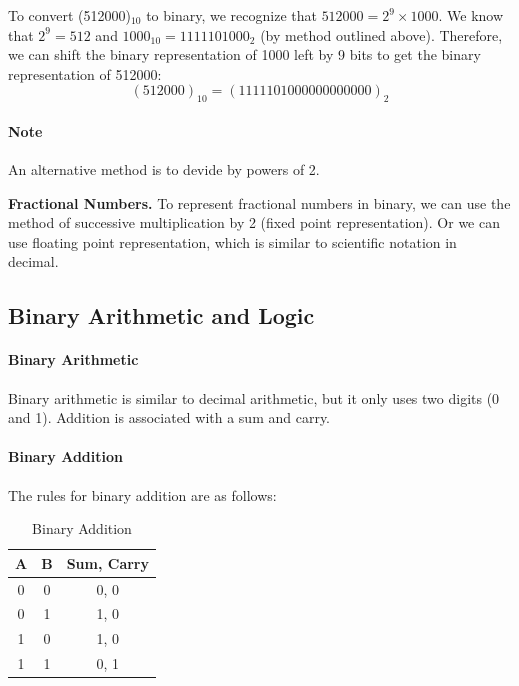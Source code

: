 \documentclass[11pt]{report}
\begin{document}
\begin{example}
    To convert (512000)$_{10}$ to binary, we recognize that $512000 = 2^9 \times 1000$. We know that $2^9 = 512$ and $1000_{10} = 1111101000_2$ (by method outlined above). Therefore, we can shift the binary representation of 1000 left by 9 bits to get the binary representation of 512000:
    \[(512000)_{10} = (1111101000000000000)_2\]
\end{example}

\paragraph{Note} An alternative method is to devide by powers of 2.
\begin{shaded}
    \textbf{Fractional Numbers. } To represent fractional numbers in binary, we can use the method of successive multiplication by 2 (fixed point representation). Or we can use floating point representation, which is similar to scientific notation in decimal. 
\end{shaded}
\subsection{Binary Arithmetic and Logic}
\paragraph{Binary Arithmetic} Binary arithmetic is similar to decimal arithmetic, but it only uses two digits (0 and 1). Addition is associated with a sum and carry.

\paragraph{Binary Addition} The rules for binary addition are as follows: \\
\begin{table}[h!]
    \centering
    \begin{tabular}{|c|c|c|}
        \hline
        A & B & Sum, Carry \\
        \hline
        0 & 0 & 0, 0 \\
        0 & 1 & 1, 0 \\
        1 & 0 & 1, 0 \\
        1 & 1 & 0, 1 \\
        \hline
    \end{tabular}
    \caption{Binary Addition}
\end{table}
\end{document}
